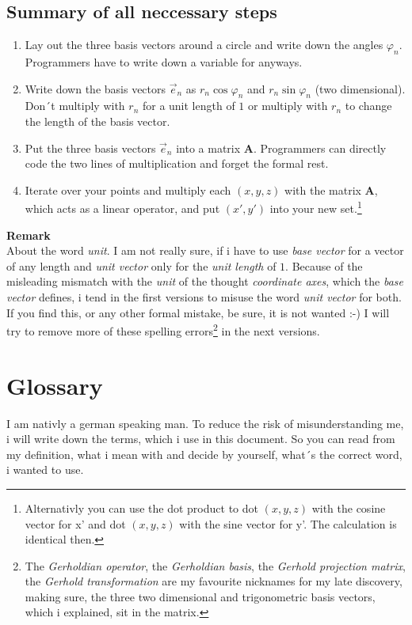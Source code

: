\documentclass[a4paper]{article}
\begin{document}
\subsection{Summary of all neccessary steps}
\begin{enumerate}
\item Lay out the three basis vectors around a circle and write down the angles $\varphi_{n}$. Programmers have to write down a variable for anyways.
\item Write down the basis vectors $\vec{e}_{n}$ as $r_{n} \cos \varphi_{n}$ and $r_{n} \sin \varphi_{n}$ (two dimensional). Don´t multiply with $r_{n}$ for a unit length of $1$ or multiply with $r_{n}$ to change the length of the basis vector.
\item Put the three basis vectors $\vec{e}_{n}$ into a matrix $\boldsymbol{A}$. Programmers can directly code the two lines of multiplication and forget the formal rest.
\item Iterate over your points and multiply each $(x,y,z)$ with the matrix $\boldsymbol{A}$, which acts as a linear operator, and put $(x',y')$ into your new set.\footnote{Alternativly you can use the dot product to dot $(x,y,z)$ with the cosine vector for x' and dot $(x,y,z)$ with the sine vector for y'. The calculation is identical then.}
\end{enumerate}

\textbf{Remark}\\
About the word \emph{unit}. I am not really sure, if i have to use \emph{base vector} for a vector of any length and \emph{unit vector} only for the \emph{unit length} of $1$. Because of the misleading mismatch with the \emph{unit} of the thought \emph{coordinate axes}, which the \emph{base vector} defines, i tend in the first versions to misuse the word \emph{unit vector} for both. If you find this, or any other formal mistake, be sure, it is not wanted :-) I will try to remove more of these spelling errors\footnote{The \emph{Gerholdian operator}, the \emph{Gerholdian basis}, the \emph{Gerhold projection matrix}, the \emph{Gerhold transformation} are my favourite nicknames for my late discovery, making sure, the three two dimensional and trigonometric basis vectors, which i explained, sit in the matrix.} in the next versions.
\section{Glossary}

I am nativly a german speaking man. To reduce the risk of misunderstanding me, i will write down the terms, which i use in this document. So you can read from my definition, what i mean with and decide by yourself, what´s the correct word, i wanted to use.\\
\end{document}
